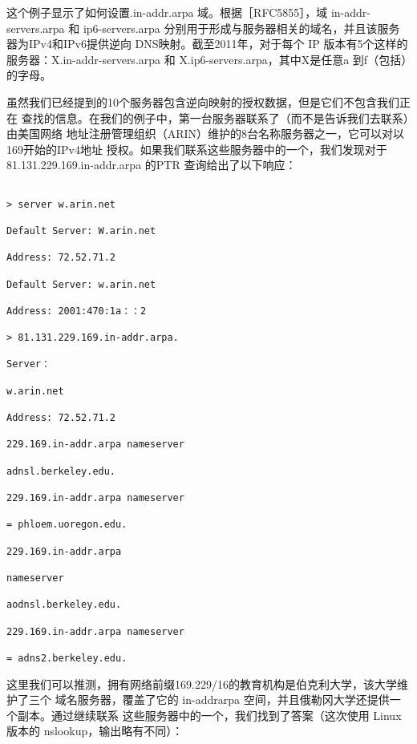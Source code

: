 这个例子显示了如何设置.in-addr.arpa 域。根据［RFC5855］，域 in-addr-servers.arpa 和
ip6-servers.arpa 分别用于形成与服务器相关的域名，并且该服务器为IPv4和IPv6提供逆向
DNS映射。截至2011年，对于每个 IP 版本有5个这样的服务器：X.in-addr-servers.arpa 和
X.ip6-servers.arpa，其中X是任意a 到f（包括）的字母。

虽然我们已经提到的10个服务器包含逆向映射的授权数据，但是它们不包含我们正在
查找的信息。在我们的例子中，第一台服务器联系了（而不是告诉我们去联系）由美国网络
地址注册管理组织（ARIN）维护的8台名称服务器之一，它可以对以 169开始的IPv4地址
授权。如果我们联系这些服务器中的一个，我们发现对于81.131.229.169.in-addr.arpa 的PTR
查询给出了以下响应：
\begin{verbatim}
    
> server w.arin.net

Default Server: W.arin.net

Address: 72.52.71.2

Default Server: w.arin.net

Address: 2001:470:1a：：2

> 81.131.229.169.in-addr.arpa.

Server：

w.arin.net

Address: 72.52.71.2

229.169.in-addr.arpa nameserver

adnsl.berkeley.edu.

229.169.in-addr.arpa nameserver

= phloem.uoregon.edu.

229.169.in-addr.arpa

nameserver

aodnsl.berkeley.edu.

229.169.in-addr.arpa nameserver

= adns2.berkeley.edu.
\end{verbatim}

这里我们可以推测，拥有网络前缀169.229/16的教育机构是伯克利大学，该大学维护了三个
域名服务器，覆盖了它的 in-addrarpa 空间，并且俄勒冈大学还提供一个副本。通过继续联系
这些服务器中的一个，我们找到了答案（这次使用 Linux版本的 nslookup，输出略有不同）：

